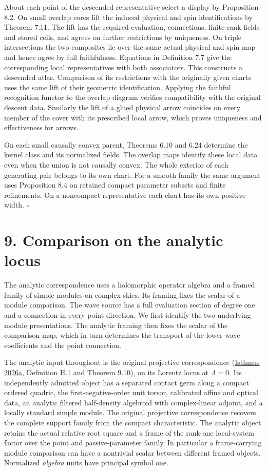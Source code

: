 \documentclass[
  english,
  11pt,
  reqno]{amsart}
\begin{document}
About each point of the descended representative select a display by
Proposition 8.2. On small overlap cores lift the induced physical and
spin identifications by Theorem 7.11. The lift has the required
evaluation, connections, finite-rank fields and stored cells, and agrees
on further restrictions by uniqueness. On triple intersections the two
composites lie over the same actual physical and spin map and hence
agree by full faithfulness. Equations in Definition 7.7 give the
corresponding local representatives with both associators. This
constructs a descended atlas. Comparison of its restrictions with the
originally given charts uses the same lift of their geometric
identification. Applying the faithful recognition functor to the overlap
diagram verifies compatibility with the original descent data. Similarly
the lift of a glued physical arrow coincides on every member of the
cover with its prescribed local arrow, which proves uniqueness and
effectiveness for arrows.

On each small causally convex parent, Theorems 6.10 and 6.24 determine
the kernel class and its normalized fields. The overlap maps identify
these local data even when the union is not causally convex. The whole
exterior of each generating pair belongs to its own chart. For a smooth
family the same argument uses Proposition 8.4 on retained compact
parameter subsets and finite refinements. On a noncompact representative
each chart has its own positive width. \hfill\(\square\)

\section{9. Comparison on the analytic
locus}\label{comparison-on-the-analytic-locus}\label{sec:analytic-wave-comparison}

The analytic correspondence uses a holomorphic operator algebra and a
framed family of simple modules on complex skies. Its framing fixes the
scalar of a module comparison. The wave source has a full evaluation
section of degree one and a connection in every point direction. We
first identify the two underlying module presentations. The analytic
framing then fixes the scalar of the comparison map, which in turn
determines the transport of the lower wave coefficients and the point
connection.

The analytic input throughout is the original projective correspondence
(\hyperref[ref-IsthmusLocal2026]{Isthmus 2026a}, Definition H.1 and
Theorem 9.10), on its Lorentz locus at \(\Lambda=0\). Its independently
admitted object has a separated contact germ along a compact ordered
quadric, the first-negative-order unit torsor, calibrated affine and
optical data, an analytic filtered half-density algebroid with
complex-linear adjoint, and a locally standard simple module. The
original projective correspondence recovers the complete support family
from the compact characteristic. The analytic object retains the actual
relative root square and a frame of the rank-one local-system factor
over the point and passive-parameter family. In particular a
frame-carrying module comparison can have a nontrivial scalar between
different framed objects. Normalized \emph{algebra} units have principal
symbol one.
\end{document}
